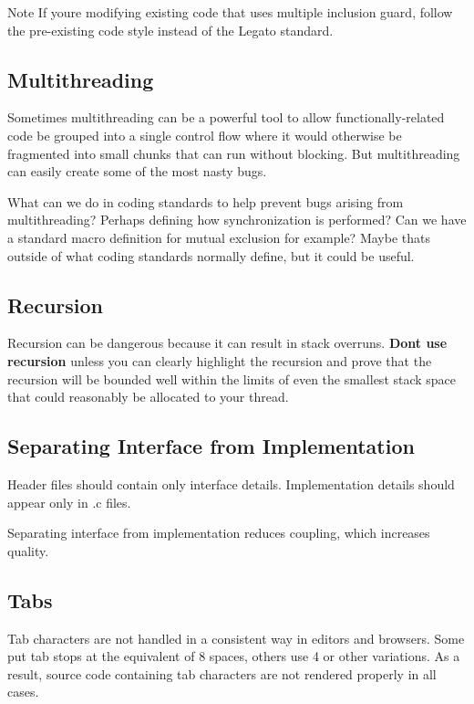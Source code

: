 \begin{DoxyNote}{Note}
If you\textquotesingle{}re modifying existing code that uses multiple inclusion guard, follow the pre-\/existing code style instead of the Legato standard.
\end{DoxyNote}
\hypertarget{ccoding_stds_main_cstdsMultithreading}{}\subsection{Multithreading}\label{ccoding_stds_main_cstdsMultithreading}
Sometimes multithreading can be a powerful tool to allow functionally-\/related code be grouped into a single control flow where it would otherwise be fragmented into small chunks that can run without blocking. But multithreading can easily create some of the most nasty bugs.

What can we do in coding standards to help prevent bugs arising from multithreading? Perhaps defining how synchronization is performed? Can we have a standard macro definition for mutual exclusion for example? Maybe that\textquotesingle{}s outside of what coding standards normally define, but it could be useful.\hypertarget{ccoding_stds_main_cstdsRecursion}{}\subsection{Recursion}\label{ccoding_stds_main_cstdsRecursion}
Recursion can be dangerous because it can result in stack overruns. {\bfseries Don\textquotesingle{}t use recursion} unless you can clearly highlight the recursion and prove that the recursion will be bounded well within the limits of even the smallest stack space that could reasonably be allocated to your thread.\hypertarget{ccoding_stds_main_cstdsSeparateInterfacefromImplementation}{}\subsection{Separating Interface from Implementation}\label{ccoding_stds_main_cstdsSeparateInterfacefromImplementation}
Header files should contain only interface details. Implementation details should appear only in {\ttfamily }.c files.

Separating interface from implementation reduces coupling, which increases quality.\hypertarget{ccoding_stds_main_cstdsTabs}{}\subsection{Tabs}\label{ccoding_stds_main_cstdsTabs}
Tab characters are not handled in a consistent way in editors and browsers. Some put tab stops at the equivalent of 8 spaces, others use 4 or other variations. As a result, source code containing tab characters are not rendered properly in all cases.

